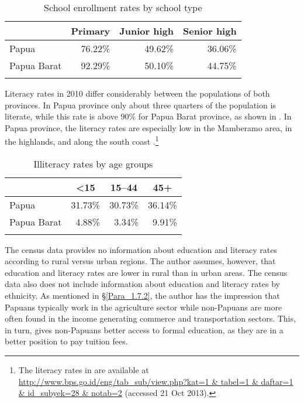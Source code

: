 {\begin{table}
\caption{School enrollment rates by school type}\label{Table_1.12}


\begin{tabular}{lrrr}
\lsptoprule

 & \multicolumn{1}{c}{Primary} & \multicolumn{1}{c}{Junior high} &  \multicolumn{1}{c}{Senior high}\\
 \midrule
Papua &  76.22\% &  49.62\% &  36.06\%\\
Papua Barat &  92.29\% &  50.10\% &  44.75\%\\
\lspbottomrule
\end{tabular}
\end{table}

Literacy rates in 2010 differ considerably between the populations of both provinces. In Papua province only about three quarters of the population is literate, while this rate is above 90\% for Papua Barat province, as shown in . In Papua province, the literacy rates are especially low in the Mamberamo area, in the highlands, and along the south coast \citep[27–30]{BidangNeracaWilayahdanAnalisisStatistik.2011}.\footnote{The literacy rates in  are available at \url{http://www.bps.go.id/eng/tab_sub/view.php?kat=1 & tabel=1 & daftar=1 & id_subyek=28 & notab=2} (accessed 21 Oct 2013).}


\begin{table}
\caption{Illiteracy rates by age groups}\label{Table_1.13}


\begin{tabular}{lrrr}
\lsptoprule

 & \multicolumn{1}{c}{{\textless}15} & \multicolumn{1}{c}{15--44} &  \multicolumn{1}{c}{45+}\\
 \midrule
Papua &  31.73\% &  30.73\% &  36.14\%\\
Papua Barat &  4.88\% &  3.34\% &  9.91\%\\
\lspbottomrule
\end{tabular}
\end{table}

The census data provides no information about education and literacy rates according to rural versus urban regions. The author assumes, however, that education and literacy rates are lower in rural than in urban areas. The census data also does not include information about education and literacy rates by ethnicity. As mentioned in §\ref{Para_1.7.2}, the author has the impression that Papuans typically work in the agriculture sector while non-Papuans are more often found in the income generating commerce and transportation sectors. This, in turn, gives non-Papuans better access to formal education, as they are in a better position to pay tuition fees.


}
